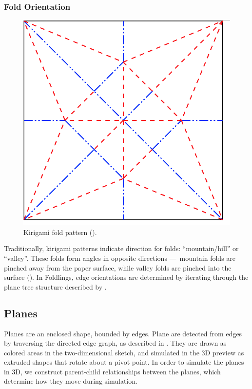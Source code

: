 \subsubsection{Fold Orientation}\label{fold-orientation}

\begin{figure}[htbp]
\centering
\includegraphics{figures/33_UI_Interface_Data_Structures/maekawas-theorem.png}
\caption{Kirigami fold pattern (\citet{maekawas-theorem}).}
\end{figure}

Traditionally, kirigami patterns indicate direction for folds:
``mountain/hill'' or ``valley''. These folds form angles in opposite
directions ---~mountain folds are pinched away from the paper surface,
while valley folds are pinched into the surface
(\citet{chatani_pop-up_1986}). In Foldlings, edge orientations are
determined by iterating through the plane tree structure described by
\citet{mallen}.

\subsection{Planes}\label{planes}

Planes are an enclosed shape, bounded by edges. Plane are detected from
edges by traversing the directed edge graph, as described in
\citet{mallen}. They are drawn as colored areas in the two-dimensional
sketch, and simulated in the 3D preview as extruded shapes that rotate
about a pivot point. In order to simulate the planes in 3D, we construct
parent-child relationships between the planes, which determine how they
move during simulation.

